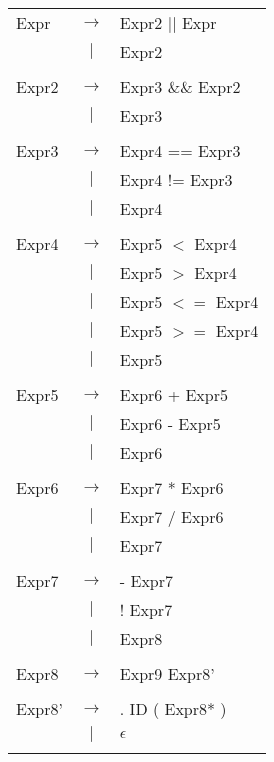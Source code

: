 \documentclass{article}
\begin{document}
\begin{tabular}{ l c l }

	Expr & $\rightarrow$ & Expr2 $||$ Expr \\
	&$|$& Expr2 \\
	\\

	Expr2 & $\rightarrow$ & Expr3 $\&\&$ Expr2 \\
	&$|$& Expr3 \\
	\\

	Expr3 & $\rightarrow$ & Expr4 == Expr3 \\
	&$|$& Expr4 != Expr3 \\
	&$|$& Expr4 \\
	\\

	Expr4 & $\rightarrow$ & Expr5 $<$ Expr4 \\
	&$|$& Expr5 $>$ Expr4 \\
	&$|$& Expr5 $<=$ Expr4 \\
	&$|$& Expr5 $>=$ Expr4 \\
	&$|$& Expr5 \\
	\\

	Expr5 & $\rightarrow$ & Expr6 + Expr5 \\
	&$|$& Expr6 - Expr5 \\
	&$|$& Expr6 \\
	\\

	Expr6 & $\rightarrow$ & Expr7 * Expr6 \\
	&$|$& Expr7 / Expr6 \\
	&$|$& Expr7 \\
	\\

	Expr7 & $\rightarrow$ & - Expr7 \\
	&$|$& ! Expr7 \\
	&$|$& Expr8 \\
	\\

	Expr8 & $\rightarrow$ & Expr9 Expr8' \\
	\\

	Expr8' & $\rightarrow$ & . ID ( Expr8* ) \\
	&$|$& $\epsilon$ \\
	\\
	


\end{tabular}
\end{document}
